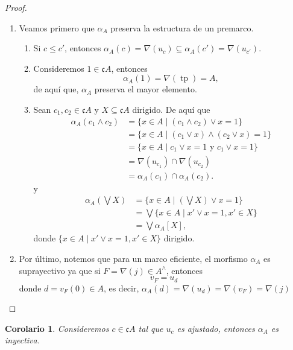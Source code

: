 \documentclass[11pt]{amsart}
\DeclareMathOperator{\tp}{tp}
\theoremstyle{plain}
\newtheorem{cor}[thm]{Corolario}
\theoremstyle{definition}
\begin{document}
\begin{proof}
    \begin{enumerate}
        \item Veamos primero que $\alpha_A$ preserva la estructura de un premarco.
    \begin{enumerate}
        \item Si $c\leq c'$,  entonces $\alpha_A(c)=\nabla(u_c)\subseteq \alpha_A(c')=\nabla(u_{c'})$.
        \item Consideremos $1\in \mathfrak{c}A$, entonces 
        \[
        \alpha_A(1)=\nabla(\tp)=A,
        \]
        de aquí que, $\alpha_A$ preserva el mayor elemento.
        \item Sean $c_1, c_2\in \mathfrak{c}A$ y $X\subseteq \mathfrak{c}A$ dirigido. De aquí que
        \[
        \begin{split}
            \alpha_A(c_1\wedge c_2)&=\{x\in A\mid (c_1\wedge c_2)\vee x=1\}\\
            &=\{x\in A\mid (c_1\vee x)\wedge (c_2\vee x)=1\}\\
            &=\{x\in A\mid c_1\vee x=1 \mbox{ y }c_1\vee x=1\}\\
            &=\nabla(u_{c_1})\cap \nabla(u_{c_2})\\
            &=\alpha_A(c_1)\cap \alpha_A(c_2).
        \end{split}
        \]
        y
        \[
        \begin{split}
        \alpha_A(\bigvee X)&=\{x\in A\mid (\bigvee X)\vee x=1\}\\
        &=\bigvee\{x\in A\mid x'\vee x=1, x'\in X\}\\
        &=\bigvee \alpha_A[X],
        \end{split}
        \]
        donde $\{x\in A\mid x'\vee x=1, x'\in X\}$ dirigido.
        \end{enumerate}
        \item Por último, notemos que para un marco eficiente, el morfismo $\alpha_A$ es suprayectivo ya que si $F=\nabla(j)\in A^\wedge$, entonces
        \[
        v_F=u_d
        \]
        donde $d=v_F(0)\in A$, es decir, $\alpha_A(d)=\nabla(u_d)=\nabla(v_F)=\nabla(j)$
    \end{enumerate}
\end{proof}

\begin{cor}
    Consideremos $c\in \mathfrak{c}A$ tal que $u_c$ es ajustado, entonces $\alpha_A$ es inyectiva. 
\end{cor}
\end{document}
